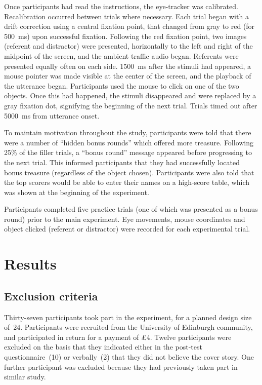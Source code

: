 \documentclass[a4paper,man,natbib]{apa6}
\begin{document}
Once participants had read the instructions, the eye-tracker was calibrated.
Recalibration occurred between trials where necessary.
Each trial began with a drift correction using a central fixation point, that changed from gray to red (for 500~ms) upon successful fixation. 
Following the red fixation point, two images (referent and distractor) were presented, horizontally to the left and right of the midpoint of the screen, and the ambient traffic audio began.
Referents were presented equally often on each side.
1500~ms after the stimuli had appeared, a mouse pointer was made visible at the center of the screen, and the playback of the utterance began.
Participants used the mouse to click on one of the two objects.
Once this had happened, the stimuli disappeared and were replaced by a gray fixation dot, signifying the beginning of the next trial. 
Trials timed out after 5000~ms from utterance onset.


To maintain motivation throughout the study, participants were told that there were a number of ``hidden bonus rounds'' which offered more treasure. 
Following 25\% of the filler trials, a ``bonus round'' message appeared before progressing to the next trial.
This informed participants that they had successfully located bonus treasure (regardless of the object chosen).
Participants were also told that the top scorers would be able to enter their names on a high-score table, which was shown at the beginning of the experiment. 

Participants completed five practice trials (one of which was presented as a bonus round) prior to the main experiment. 
Eye movements, mouse coordinates and object clicked (referent or distractor) were recorded for each experimental trial.


\section{Results}
\subsection{Exclusion criteria}
Thirty-seven participants took part in the experiment, for a planned design size of~24.
Participants were recruited from the University of Edinburgh community, and participated in return for a payment of \pounds{}4.
Twelve participants were excluded on the basis that they indicated either in the post-test questionnaire~(10) or verbally~(2) that they did not believe the cover story.
One further participant was excluded because they had previously taken part in similar study.
\end{document}
